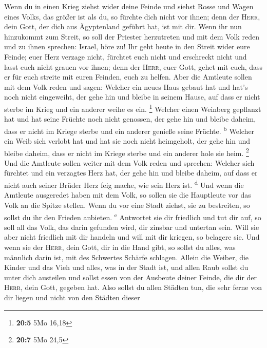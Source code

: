  Wenn du in einen Krieg ziehst wider deine Feinde und
siehst Rosse und Wagen eines Volks, das größer ist als du, so fürchte
dich nicht vor ihnen; denn der \textsc{Herr}, dein Gott, der dich aus
Ägyptenland geführt hat, ist mit dir.  Wenn ihr nun
hinzukommt zum Streit, so soll der Priester herzutreten und mit dem Volk
reden  und zu ihnen sprechen: Israel, höre zu! Ihr geht
heute in den Streit wider eure Feinde; euer Herz verzage nicht, fürchtet
euch nicht und erschreckt nicht und lasst euch nicht grauen vor ihnen;
 denn der \textsc{Herr}, euer Gott, gehet mit euch, dass
er für euch streite mit euren Feinden, euch zu helfen. 
Aber die Amtleute sollen mit dem Volk reden und sagen: Welcher ein neues
Haus gebaut hat und hat's noch nicht eingeweiht, der gehe hin und bleibe
in seinem Hause, auf dass er nicht sterbe im Krieg und ein anderer weihe
es ein. \footnote{\textbf{20:5} 5Mo 16,18}  Welcher einen
Weinberg gepflanzt hat und hat seine Früchte noch nicht genossen, der
gehe hin und bleibe daheim, dass er nicht im Kriege sterbe und ein
anderer genieße seine Früchte. \textsuperscript{b} 
Welcher ein Weib sich verlobt hat und hat sie noch nicht heimgeholt, der
gehe hin und bleibe daheim, dass er nicht im Kriege sterbe und ein
anderer hole sie heim. \footnote{\textbf{20:7} 5Mo 24,5} 
Und die Amtleute sollen weiter mit dem Volk reden und sprechen: Welcher
sich fürchtet und ein verzagtes Herz hat, der gehe hin und bleibe
daheim, auf dass er nicht auch seiner Brüder Herz feig mache, wie sein
Herz ist. \textsuperscript{d}  Und wenn die Amtleute
ausgeredet haben mit dem Volk, so sollen sie die Hauptleute vor das Volk
an die Spitze stellen.  Wenn du vor eine Stadt ziehst,
sie zu bestreiten, so sollst du ihr den Frieden anbieten.
\textsuperscript{e}  Antwortet sie dir friedlich und tut
dir auf, so soll all das Volk, das darin gefunden wird, dir zinsbar und
untertan sein.  Will sie aber nicht friedlich mit dir
handeln und will mit dir kriegen, so belagere sie.  Und
wenn sie der \textsc{Herr}, dein Gott, dir in die Hand gibt, so sollst
du alles, was männlich darin ist, mit des Schwertes Schärfe schlagen.
 Allein die Weiber, die Kinder und das Vieh und alles,
was in der Stadt ist, und allen Raub sollst du unter dich austeilen und
sollst essen von der Ausbeute deiner Feinde, die dir der \textsc{Herr},
dein Gott, gegeben hat.  Also sollst du allen Städten
tun, die sehr ferne von dir liegen und nicht von den Städten dieser
